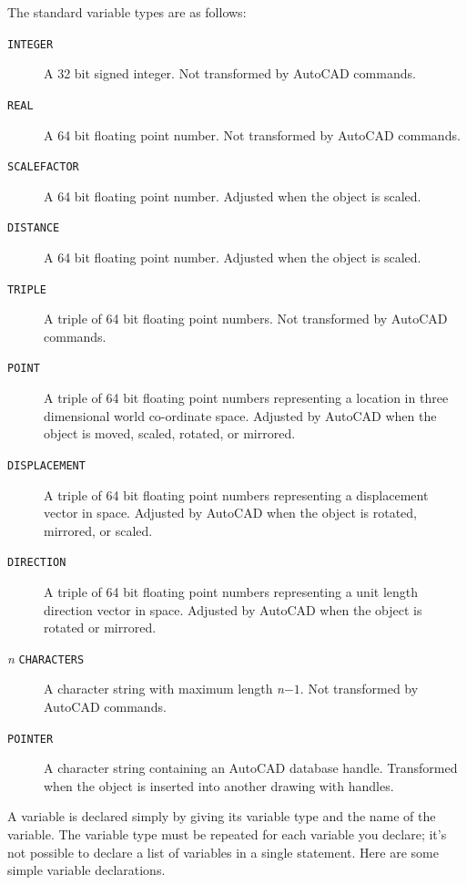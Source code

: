\documentclass{article}
\begin{document}
The standard variable types are as follows:
\begin{description}
\item[{\tt INTEGER}]    A 32 bit signed integer.  Not transformed
                        by AutoCAD commands.
\item[{\tt REAL}]       A 64 bit floating point number.  Not
                        transformed by AutoCAD commands.
\item[{\tt SCALEFACTOR}] A 64 bit floating point number.  Adjusted
                        when the object is scaled.
\item[{\tt DISTANCE}]   A 64 bit floating point number.  Adjusted when
                        the object is scaled.
\item[{\tt TRIPLE}]     A triple of 64 bit floating point numbers.
                        Not transformed by AutoCAD commands.
\item[{\tt POINT}]      A triple of 64 bit floating point numbers
                        representing a location in three dimensional
                        world co-ordinate space.  Adjusted by AutoCAD
                        when the object is moved, scaled, rotated, or
                        mirrored.
\item[{\tt DISPLACEMENT}] A triple of 64 bit floating point numbers
                        representing a displacement vector in space.
                        Adjusted by AutoCAD when the object is
                        rotated, mirrored, or scaled.
\item[{\tt DIRECTION}]  A triple of 64 bit floating point numbers
                        representing a unit length direction vector
                        in space.  Adjusted by AutoCAD when the object
                        is rotated or mirrored.
\item[{\em n} {\tt CHARACTERS}] A character string with maximum
                        length {\em n}$-1$.  Not transformed by
                        AutoCAD commands.
\item[{\tt POINTER}]    A character string containing an AutoCAD
                        database handle.  Transformed when the object
                        is inserted into another drawing with handles.
\end{description}

A variable is declared simply by giving its variable type and the name
of the variable.  The variable type must be repeated for each variable
you declare; it's not possible to declare a list of variables in a
single statement.  Here are some simple variable declarations.
\end{document}
